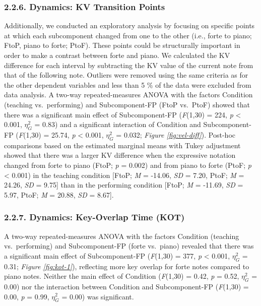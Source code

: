 \documentclass[
  english,
  man,floatsintext]{apa6}
\begin{document}
\hypertarget{dynamics-kv-transition-points}{%
\subsubsection{2.2.6. Dynamics: KV Transition Points}\label{dynamics-kv-transition-points}}

Additionally, we conducted an exploratory analysis by focusing on specific points at which each subcomponent changed from one to the other (i.e., forte to piano; FtoP, piano to forte; PtoF). These points could be structurally important in order to make a contrast between forte and piano. We calculated the KV difference for each interval by subtracting the KV value of the current note from that of the following note. Outliers were removed using the same criteria as for the other dependent variables and less than 5 \% of the data were excluded from data analysis. A two-way repeated-measures ANOVA with the factors Condition (teaching vs.~performing) and Subcomponent-FP (FtoP vs.~PtoF) showed that there was a significant main effect of Subcomponent-FP (\emph{F}(1,30) = 224, \emph{p} \textless{} 0.001, \(\eta_G^2\) = 0.83) and a significant interaction of Condition and Subcomponent-FP (\emph{F}(1,30) = 25.74, \emph{p} \textless{} 0.001, \(\eta_G^2\) = 0.032; \emph{Figure \ref{fig:vel-diff}}). Post-hoc comparisons based on the estimated marginal means with Tukey adjustment showed that there was a larger KV difference when the expressive notation changed from forte to piano (FtoP; \emph{p} = 0.002) and from piano to forte (PtoF; \emph{p} \textless{} 0.001) in the teaching condition {[}FtoP; \emph{M} = -14.06, \emph{SD} = 7.20, PtoF; \emph{M} = 24.26, \emph{SD} = 9.75{]} than in the performing condition {[}FtoP; \emph{M} = -11.69, \emph{SD} = 5.97, PtoF; \emph{M} = 20.88, \emph{SD} = 8.67{]}.

\hypertarget{dynamics-key-overlap-time-kot}{%
\subsubsection{2.2.7. Dynamics: Key-Overlap Time (KOT)}\label{dynamics-key-overlap-time-kot}}

A two-way repeated-measures ANOVA with the factors Condition (teaching vs.~performing) and Subcomponent-FP (forte vs.~piano) revealed that there was a significant main effect of Subcomponent-FP (\emph{F}(1,30) = 377, \emph{p} \textless{} 0.001, \(\eta_G^2\) = 0.31; \emph{Figure \ref{fig:kot-1}}), reflecting more key overlap for forte notes compared to piano notes. Neither the main effect of Condition (\emph{F}(1,30) = 0.42, \emph{p} = 0.52, \(\eta_G^2\) = 0.00) nor the interaction between Condition and Subcomponent-FP (\emph{F}(1,30) = 0.00, \emph{p} = 0.99, \(\eta_G^2\) = 0.00) was significant.
\end{document}
